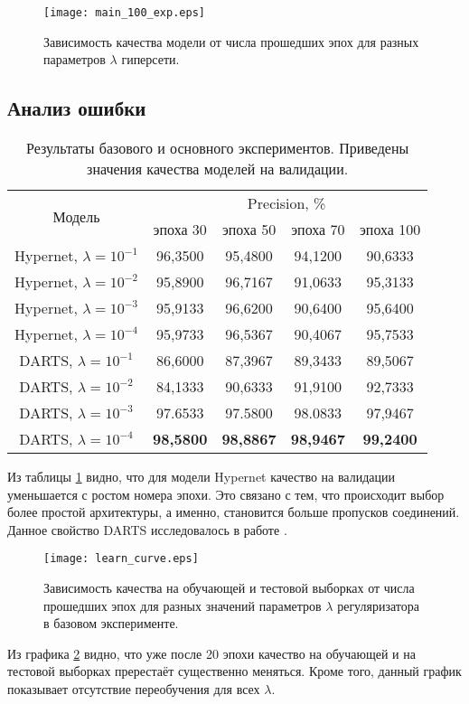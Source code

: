 \documentclass[12pt, twoside]{article}
\begin{document}
\begin{figure}[H]
\centering
  \texttt{[image: main\_100\_exp.eps]}
  \caption{Зависимость качества модели от числа прошедших эпох для разных параметров $\lambda$ гиперсети.}
  \label{fig:main_exp}
\end{figure}

\subsection{Анализ ошибки}

\begin{table}[H]
\centering
	\begin{tabular}{ |c|c|c|c|c| }
	\hline
	 \multirow{2}{*}{Модель} & \multicolumn{4}{c|}{Precision, \%} \\ \cline{2-5}
	 		& эпоха 30 & эпоха 50 & эпоха 70 & эпоха 100\\
	 \hline
 	Hypernet, $\lambda = 10^{-1}$ &96,3500 & 95,4800 & 94,1200 & 90,6333  \\ 
 	Hypernet, $\lambda = 10^{-2}$ &95,8900 & 96,7167& 91,0633 & 95,3133 \\ 
 	Hypernet, $\lambda = 10^{-3}$ &95,9133 & 96,6200 & 90,6400 & 95,6400 \\ 
 	Hypernet, $\lambda = 10^{-4}$ &95,9733 & 96,5367 & 90,4067 & 95,7533\\
 	\hline
 	DARTS, $\lambda = 10^{-1}$ &86,6000 &87,3967 & 89,3433 & 89,5067 \\
 	DARTS, $\lambda = 10^{-2}$ & 84,1333 & 90,6333 &91,9100 & 92,7333\\
 	DARTS, $\lambda = 10^{-3}$ &97.6533 & 97.5800 & 98.0833 & 97,9467 \\
 	DARTS, $\lambda = 10^{-4}$ & \textbf{98,5800} &  \textbf{98,8867}&\textbf{98,9467}&\textbf{99,2400} \\
 	\hline
\end{tabular}
\caption{\label{tab:exp} Результаты базового и основного экспериментов. Приведены значения качества моделей на валидации.}
\end{table}


Из таблицы \ref{tab:exp} видно, что для модели Hypernet качество на валидации уменьшается с ростом номера эпохи. Это связано с тем, что происходит выбор более простой архитектуры, а именно, становится больше пропусков соединений. Данное свойство DARTS исследовалось в работе \cite{journals/corr/abs-1911-12126}.

\begin{figure}[H]
\centering
  \texttt{[image: learn\_curve.eps]}
  \caption{Зависимость качества на обучающей и тестовой выборках от числа прошедших эпох для разных значений параметров $\lambda$ регуляризатора в базовом эксперименте.}
  \label{fig:learn_curve}
\end{figure}
 Из графика \ref{fig:learn_curve} видно, что уже после 20 эпохи качество на обучающей и на тестовой выборках пререстаёт существенно меняться. Кроме того, данный график показывает отсутствие переобучения для всех $\lambda$.
\end{document}
